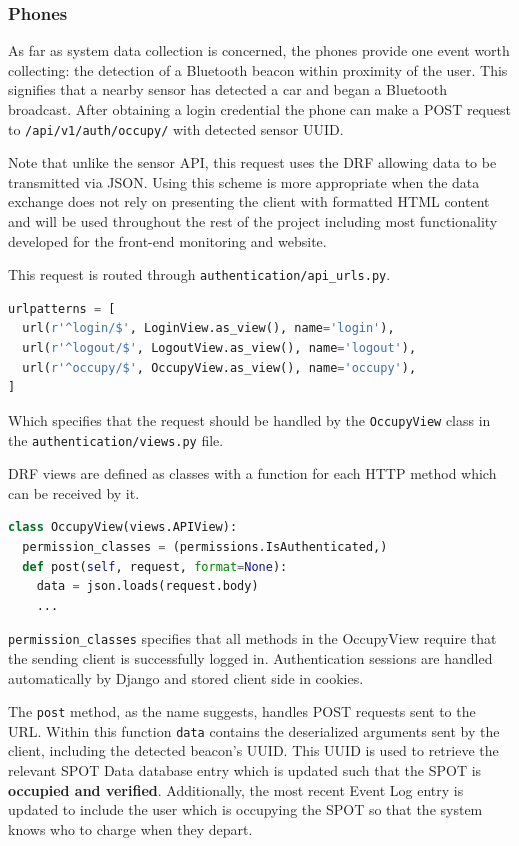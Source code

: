 \subsubsection{Phones}
As far as system data collection is concerned, the phones provide one event worth collecting: the detection of a Bluetooth beacon within proximity of the user.
This signifies that a nearby sensor has detected a car and began a Bluetooth broadcast.
After obtaining a login credential the phone can make a POST request to \verb|/api/v1/auth/occupy/| with detected sensor UUID.

Note that unlike the sensor API, this request uses the DRF allowing data to be transmitted via JSON.
Using this scheme is more appropriate when the data exchange does not rely on presenting the client with formatted HTML content and will be used throughout the rest of the project including most functionality developed for the front-end monitoring and website.

This request is routed through \verb|authentication/api_urls.py|.
\begin{lstlisting}[language=Python]
urlpatterns = [
  url(r'^login/$', LoginView.as_view(), name='login'),
  url(r'^logout/$', LogoutView.as_view(), name='logout'),
  url(r'^occupy/$', OccupyView.as_view(), name='occupy'),
]
\end{lstlisting}
Which specifies that the request should be handled by the \verb|OccupyView| class in the \verb|authentication/views.py| file.

DRF views are defined as classes with a function for each HTTP method which can be received by it.
\begin{lstlisting}[language=Python]
class OccupyView(views.APIView):
  permission_classes = (permissions.IsAuthenticated,)
  def post(self, request, format=None):
    data = json.loads(request.body)
    ...
\end{lstlisting}
\verb|permission_classes| specifies that all methods in the OccupyView require that the sending client is successfully logged in.
Authentication sessions are handled automatically by Django and stored client side in cookies.

The \verb|post| method, as the name suggests, handles POST requests sent to the URL.
Within this function \verb|data| contains the deserialized arguments sent by the client, including the detected beacon's UUID.
This UUID is used to retrieve the relevant SPOT Data database entry which is updated such that the SPOT is \textbf{occupied and verified}.
Additionally, the most recent Event Log entry is updated to include the user which is occupying the SPOT so that the system knows who to charge when they depart.

